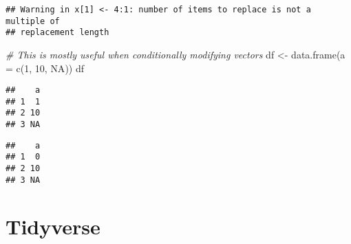 \documentclass[
]{book}
\newenvironment{Shaded}{\begin{snugshade}}{\end{snugshade}}
\newcommand{\AttributeTok}[1]{\textcolor[rgb]{0.77,0.63,0.00}{#1}}
\newcommand{\CommentTok}[1]{\textcolor[rgb]{0.56,0.35,0.01}{\textit{#1}}}
\newcommand{\ConstantTok}[1]{\textcolor[rgb]{0.00,0.00,0.00}{#1}}
\newcommand{\DecValTok}[1]{\textcolor[rgb]{0.00,0.00,0.81}{#1}}
\newcommand{\FunctionTok}[1]{\textcolor[rgb]{0.00,0.00,0.00}{#1}}
\newcommand{\NormalTok}[1]{#1}
\newcommand{\OtherTok}[1]{\textcolor[rgb]{0.56,0.35,0.01}{#1}}
\newcommand{\SpecialCharTok}[1]{\textcolor[rgb]{0.00,0.00,0.00}{#1}}
\begin{document}
\begin{verbatim}
## Warning in x[1] <- 4:1: number of items to replace is not a multiple of
## replacement length
\end{verbatim}

\begin{Shaded}
\begin{Highlighting}[]
\CommentTok{\# This is mostly useful when conditionally modifying vectors}
\NormalTok{df }\OtherTok{\textless{}{-}} \FunctionTok{data.frame}\NormalTok{(}\AttributeTok{a =} \FunctionTok{c}\NormalTok{(}\DecValTok{1}\NormalTok{, }\DecValTok{10}\NormalTok{, }\ConstantTok{NA}\NormalTok{))}
\NormalTok{df}
\end{Highlighting}
\end{Shaded}

\begin{verbatim}
##    a
## 1  1
## 2 10
## 3 NA
\end{verbatim}

\begin{Shaded}
\end{Shaded}

\begin{verbatim}
##    a
## 1  0
## 2 10
## 3 NA
\end{verbatim}

\hypertarget{tidyverse}{%
\section{Tidyverse}\label{tidyverse}}
\end{document}
